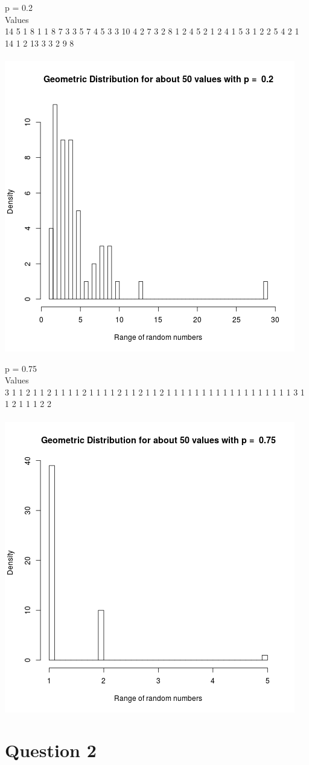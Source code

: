 \documentclass{article}
\begin{document}
p = 0.2\\
Values\\
14  5  1  8  1  1  8  7  3  3  5  7  4  5  3  3 10  4  2  7  3  2  8  1  2 
 4  5  2  1  2  4  1  5  3  1  2  2  5  4  2  1 14  1  2 13  3  3  2  9  8\\\\
\includegraphics{"plot1_2"}
\pagebreak

p = 0.75\\
Values\\
3 1 1 2 1 1 2 1 1 1 1 2 1 1 1 1 2 1 1 2 1 1 2 1 1 1 1 1 1 1 1 1 1 1 1 1 1 1 
1 1 1 3 1 1 2 1 1 1 2 2\\\\
\includegraphics{"plot1_3"}
\pagebreak

\section{Question 2}


\begin{lstlisting}

\end{lstlisting}
\end{document}
